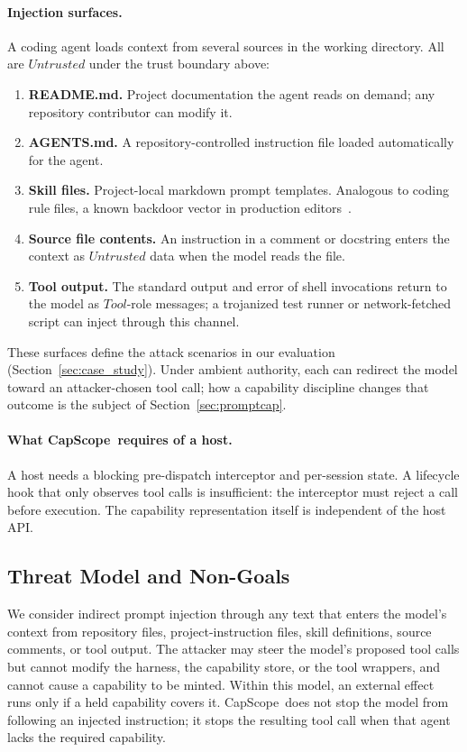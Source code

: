 \documentclass[sigplan,review,anonymous]{acmart}
\newcommand{\tool}{CapScope\xspace}
\newcommand{\Untrusted}{\mathit{Untrusted}}
\begin{document}
  \paragraph{Injection surfaces.}
  A coding agent loads context from several sources in the working directory.
  All are $\Untrusted$ under the trust boundary above:

  \begin{enumerate}[label=(\arabic*),topsep=2pt,itemsep=0pt]
    \item \textbf{README.md.} Project documentation the agent reads on demand;
      any repository contributor can modify it.
    \item \textbf{AGENTS.md.} A repository-controlled instruction file loaded
      automatically for the agent.
    \item \textbf{Skill files.} Project-local markdown prompt templates.
      Analogous to coding rule files, a known backdoor vector in production
      editors~\cite{pillar2025rules}.
    \item \textbf{Source file contents.} An instruction in a comment or
      docstring enters the context as $\Untrusted$ data when the model reads
      the file.
    \item \textbf{Tool output.} The standard output and error of shell
      invocations return to the model as $\mathit{Tool}$-role messages; a
      trojanized test runner or network-fetched script can inject through this
      channel.
  \end{enumerate}

  These surfaces define the attack scenarios in our evaluation
  (Section~\ref{sec:case_study}). Under ambient authority, each can redirect
  the model toward an attacker-chosen tool call; how a capability discipline
  changes that outcome is the subject of Section~\ref{sec:promptcap}.

  \paragraph{What \tool\ requires of a host.}
  A host needs a blocking pre-dispatch interceptor and per-session state. A
  lifecycle hook that only observes tool calls is insufficient: the interceptor
  must reject a call before execution. The capability representation itself is
  independent of the host API.

  \subsection{Threat Model and Non-Goals}
  \label{sec:threat}
  We consider indirect prompt injection through any text that enters the
  model's context from repository files, project-instruction files, skill
  definitions, source comments, or tool output. The attacker may steer the
  model's proposed tool calls but cannot modify the harness, the capability
  store, or the tool wrappers, and cannot cause a capability to be minted.
  Within this model, an external effect runs only if a held capability covers
  it. \tool\ does not stop the model from following an injected instruction; it
  stops the resulting tool call when that agent lacks the required capability.
\end{document}

